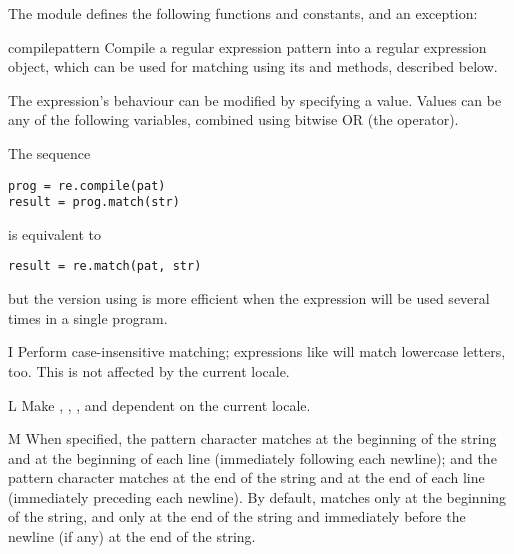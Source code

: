 The module defines the following functions and constants, and an exception:


\begin{funcdesc}{compile}{pattern}
  Compile a regular expression pattern into a regular expression
  object, which can be used for matching using its  and
   methods, described below.  

  The expression's behaviour can be modified by specifying a
   value.  Values can be any of the following variables,
  combined using bitwise OR (the \code{|} operator).

The sequence

\begin{verbatim}
prog = re.compile(pat)
result = prog.match(str)
\end{verbatim}

is equivalent to

\begin{verbatim}
result = re.match(pat, str)
\end{verbatim}

but the version using  is more efficient when the
expression will be used several times in a single program.
\end{funcdesc}

\begin{datadesc}{I}
Perform case-insensitive matching; expressions like \regexp{[A-Z]} will match
lowercase letters, too.  This is not affected by the current locale.
\end{datadesc}

\begin{datadesc}{L}
Make , , , and
 dependent on the current locale. 
\end{datadesc}

\begin{datadesc}{M}
When specified, the pattern character \character{\^} matches at the
beginning of the string and at the beginning of each line
(immediately following each newline); and the pattern character
\character{\$} matches at the end of the string and at the end of each line
(immediately preceding each newline).
By default, \character{\^} matches only at the beginning of the string, and
\character{\$} only at the end of the string and immediately before the
newline (if any) at the end of the string. 
\end{datadesc}

